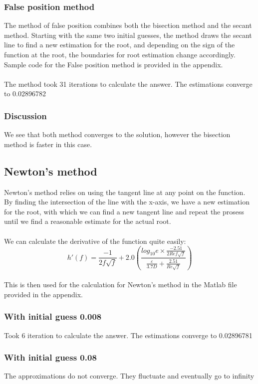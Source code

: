\documentclass{book}
\begin{document}
    \subsubsection{False position method}
    The method of false position combines both the bisection method and the secant method. Starting with the same two initial guesses, the method draws the secant line to find a new estimation for the root, and depending on the sign of the function at the root, the boundaries for root estimation change accordingly. Sample code for the False position method is provided in the appendix. \\
    \\
    The method took 31 iterations to calculate the answer. The estimations converge to 0.02896782
    \subsubsection{Discussion}
    We see that both method converges to the solution, however the bisection method is faster in this case.
    \subsection{Newton's method}
	Newton's method relies on using the tangent line at any point on the function. By finding the intersection of the line with the x-axis, we have a new estimation for the root, with which we can find a new tangent line and repeat the prosess until we find a reasonable estimate for the actual root.    \\
	\\
    We can calculate the derivative of the function quite easily: \\
    \[ h'(f) = \frac{-1}{2 f \sqrt{f}} + 2.0 \left(\frac{log_{10} e \times \frac{-2.51}{2 \textit{Re} f \sqrt{f}}}{\frac{\varepsilon}{3.7D} + \frac{2.51}{\textit{Re}\sqrt{f}}}\right) \]\\
    This is then used for the calculation for Newton's method in the Matlab file provided in the appendix.
    \subsubsection{With initial guess 0.008}
    Took 6 iteration to calculate the answer. The estimations converge to 0.02896781 
    \subsubsection{With initial guess 0.08}
    The approximations do not converge. They fluctuate and eventually go to infinity
\end{document}
